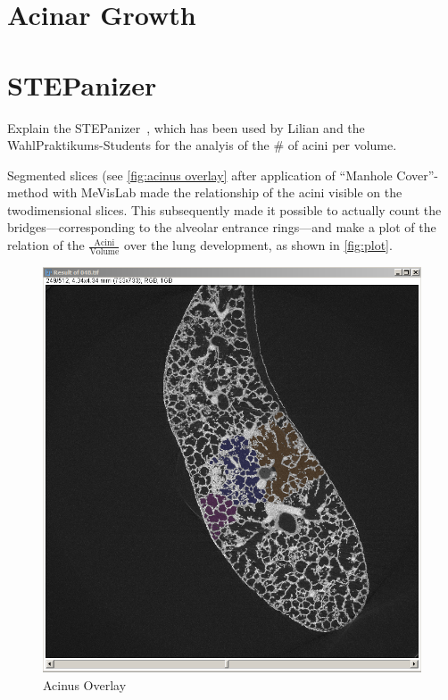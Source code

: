 \begin{figure}
	\label{fig:skeletonization}%
\end{figure}

\section{Acinar Growth}

\section{STEPanizer}
Explain the STEPanizer~\cite{Tschanz2010}, which has been used by Lilian and the WahlPraktikums-Students for the analyis of the \# of acini per volume.

Segmented slices (see \autoref{fig:acinus overlay} after application of ``Manhole Cover''-method with MeVisLab made the relationship of the acini visible on the twodimensional slices. This subsequently made it possible to actually count the bridges---corresponding to the alveolar entrance rings---and make a plot of the relation of the $\frac{\textrm{Acini}}{\textrm{Volume}}$ over the lung development, as shown in \autoref{fig:plot}.

\renewcommand{\imsize}{0.618\linewidth}
\begin{figure}
	\centering
	\includegraphics[width=\imsize]{img/Acinus_Overlay}
	\caption{Acinus Overlay}
	\label{fig:acinus overlay}
\end{figure}

